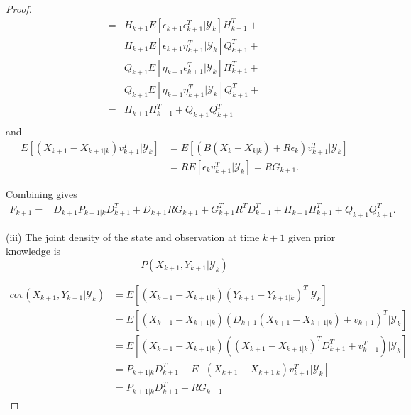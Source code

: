 \documentclass{article}
\theoremstyle{definition}
\theoremstyle{remark}
\newcommand{\filtrationObs}[1]{\ensuremath{\mathscr{Y}_{#1}}}
\begin{document}
\begin{proof}
\begin{align*}
=&H_{k+1}E[\epsilon_{k+1}\epsilon_{k+1}^T|\filtrationObs{k}]H_{k+1}^T+\\
&H_{k+1}E[\epsilon_{k+1}\eta_{k+1}^T|\filtrationObs{k}]Q_{k+1}^T+\\
&Q_{k+1}E[\eta_{k+1}\epsilon_{k+1}^T|\filtrationObs{k}]H_{k+1}^T+\\
&Q_{k+1}E[\eta_{k+1}\eta_{k+1}^T|\filtrationObs{k}]Q_{k+1}^T+\\
%
=&H_{k+1}H_{k+1}^T+Q_{k+1}Q_{k+1}^T\\
\end{align*}
and
\begin{align*}
E[(X_{k+1}-X_{k+1|k})v_{k+1}^T|\filtrationObs{k}] &= E[(B(X_k-X_{k|k})+R\epsilon_k)v_{k+1}^T|\filtrationObs{k}]\\
&=RE[\epsilon_kv_{k+1}^T|\filtrationObs{k}]=RG_{k+1}.
\end{align*}


Combining gives
\begin{align*}
F_{k+1}
%
%
=&D_{k+1}P_{k+1|k}D_{k+1}^T + D_{k+1}RG_{k+1} + G_{k+1}^TR^TD_{k+1}^T + H_{k+1}H_{k+1}^T+Q_{k+1}Q_{k+1}^T.
\end{align*}

(iii) The joint density of the state and observation at time $k+1$ given prior knowledge is
$$P(X_{k+1}, Y_{k+1}|\filtrationObs{k})$$%

\begin{align*}
cov(X_{k+1}, Y_{k+1}|\filtrationObs{k})&=E[(X_{k+1}-X_{k+1|k})(Y_{k+1}-Y_{k+1|k})^T|\filtrationObs{k}]\\
&=E[(X_{k+1}-X_{k+1|k})(D_{k+1}(X_{k+1}-X_{k+1|k})+v_{k+1})^T|\filtrationObs{k}]\\
&=E[(X_{k+1}-X_{k+1|k})((X_{k+1}-X_{k+1|k})^TD_{k+1}^T+v_{k+1}^T)|\filtrationObs{k}]\\
&=P_{k+1|k}D_{k+1}^T+E[(X_{k+1}-X_{k+1|k})v_{k+1}^T|\filtrationObs{k}]\\
&=P_{k+1|k}D_{k+1}^T+RG_{k+1}
\end{align*}


\end{proof}
\end{document}
